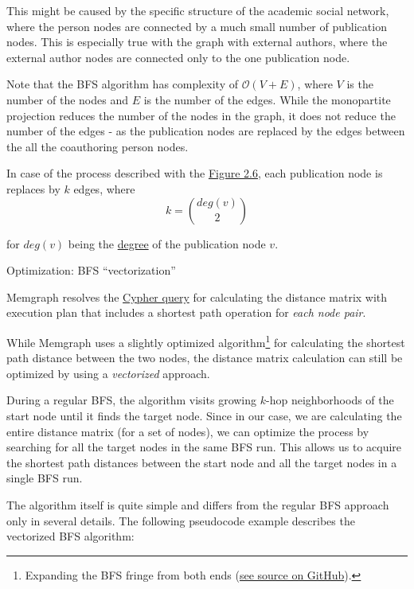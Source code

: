 This might be caused by the specific structure of the academic social network, where the person nodes are connected by a much small number of publication nodes.
This is especially true with the graph with external authors, where the external author nodes are connected only to the one publication node.

Note that the BFS algorithm has complexity of $\mathcal{O}(V + E)$, where $V$ is the number of the nodes and $E$ is the number of the edges.
While the monopartite projection reduces the number of the nodes in the graph, it does not reduce the number of the edges - as the publication nodes are replaced 
by the edges between the all the coauthoring person nodes. 

In case of the process described with the \hyperref[fig:monopartite-projection]{Figure 2.6}, each publication node is replaces 
by $k$ edges, where 
$$
k = \binom{deg(v)}{2}
$$

for $deg(v)$ being the \hyperref[def:node-degree]{degree} of the publication node $v$.

\newpage

\begin{mybox}
    {Optimization: BFS ``vectorization''}

    Memgraph resolves the \hyperref[fig:distance-matrix-calculation]{Cypher query} for calculating the distance matrix
    with execution plan that includes a shortest path operation for \textit{each node pair}.

    While Memgraph uses a slightly optimized algorithm\footnote{Expanding the BFS fringe from both ends (\href{https://github.com/memgraph/memgraph/blob/58c3902c194e80a027d141788bd1afd07def0114/src/query/plan/operator.cpp\#L1569-L1572}{see source on GitHub}).} for calculating the shortest path distance between the two nodes,    
    the distance matrix calculation can still be optimized by using a \textit{vectorized} approach.

    During a regular BFS, the algorithm visits growing $k$-hop neighborhoods of the start node until it finds the target node.
    Since in our case, we are calculating the entire distance matrix (for a set of nodes), 
    we can optimize the process by searching for all the target nodes in the same BFS run.
    This allows us to acquire the shortest path distances between the start node and all 
    the target nodes in a single BFS run.

\end{mybox}

The algorithm itself is quite simple and differs from the regular BFS approach only in several details.
The following pseudocode example describes the vectorized BFS algorithm:

